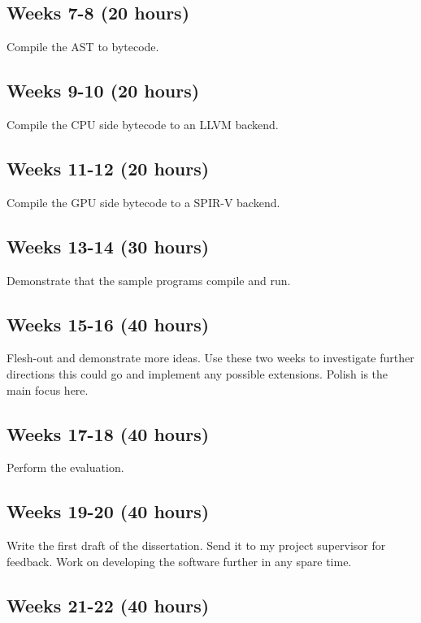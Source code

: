 \documentclass[11pt]{article}
\begin{document}
\subsection{Weeks 7-8 (20 hours)}

Compile the AST to bytecode.

\subsection{Weeks 9-10 (20 hours)}

Compile the CPU side bytecode to an LLVM backend.

\subsection{Weeks 11-12 (20 hours)}

Compile the GPU side bytecode to a SPIR-V backend.

\subsection{Weeks 13-14 (30 hours)}

Demonstrate that the sample programs compile and run.

\subsection{Weeks 15-16 (40 hours)}

Flesh-out and demonstrate more ideas. Use these two weeks to investigate
further directions this could go and implement any possible extensions. Polish
is the main focus here.

\subsection{Weeks 17-18 (40 hours)}

Perform the evaluation.

\subsection{Weeks 19-20 (40 hours)}

Write the first draft of the dissertation. Send it to my project supervisor for
feedback. Work on developing the software further in any spare time.

\subsection{Weeks 21-22 (40 hours)}
\end{document}
